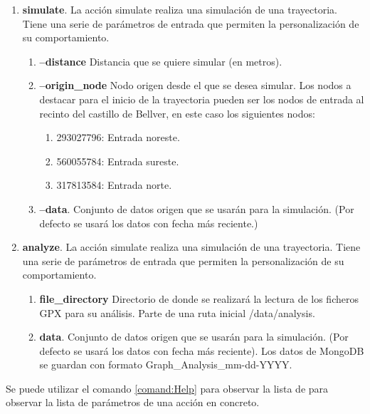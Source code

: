 \begin{enumerate}[label={A.\arabic*.}]
\item \textbf{simulate}. La acción simulate realiza una simulación de una trayectoria. Tiene una serie de parámetros de entrada que permiten la personalización de su comportamiento.

\begin{enumerate}[label*={P.\arabic*.}]
\item \textbf{--distance} Distancia que se quiere simular (en metros).

\item \textbf{--origin\_node} Nodo origen desde el que se desea simular. Los nodos a destacar para el inicio de la trayectoria pueden ser los nodos de entrada al recinto del castillo de Bellver, en este caso los siguientes nodos:
\begin{enumerate}
\item 293027796: Entrada noreste.
\item 560055784: Entrada sureste.
\item 317813584: Entrada norte.
\end{enumerate}

\item \textbf{--data}. Conjunto de datos origen que se usarán para la simulación. (Por defecto se usará los datos con fecha más reciente.)
\end{enumerate}

\item \textbf{analyze}. La acción simulate realiza una simulación de una trayectoria. Tiene una serie de parámetros de entrada que permiten la personalización de su comportamiento.

\begin{enumerate}[label*={P.\arabic*.}]
\item \textbf{\-\-file\_directory} Directorio de donde se realizará la lectura de los ficheros \ac{GPX} para su análisis. Parte de una ruta inicial \slash data\slash analysis.

\item \textbf{\-\-data}. Conjunto de datos origen que se usarán para la simulación. (Por defecto se usará los datos con fecha más reciente). Los datos de MongoDB se guardan con formato Graph\_Analysis\_mm-dd-YYYY.
\end{enumerate}
\end{enumerate}

Se puede utilizar el comando \ref{comand:Help} para observar la lista de para observar la lista de parámetros de una acción en concreto.

